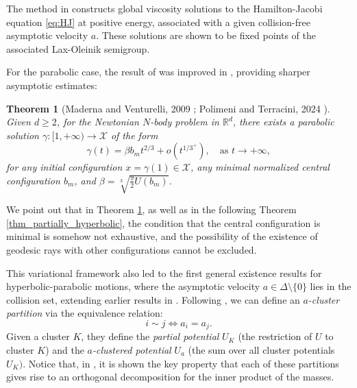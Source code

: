 \documentclass[a4paper,10pt]{amsart}
\theoremstyle{plain}
\newtheorem{thm}{Theorem}
\theoremstyle{definition}
\numberwithin{equation}{section}
\numberwithin{thm}{section}
\begin{document}
The method in \cite{MadernaVenturelli_HyperbolicMotions} constructs global viscosity solutions to the Hamilton-Jacobi equation \eqref{eq:HJ} at positive energy, associated with a given collision-free asymptotic velocity $a$. These solutions are shown to be fixed points of the associated Lax-Oleinik semigroup.

For the parabolic case, the result of \cite{MadernaVenturelli_GloballyMinimizingParabolic} was improved in \cite{PolimeniTerracini}, providing sharper asymptotic estimates:

\begin{thm}[Maderna and Venturelli, 2009 \cite{MadernaVenturelli_GloballyMinimizingParabolic}; Polimeni and Terracini, 2024 \cite{PolimeniTerracini}]\label{thm_parabolic}
    Given $d \geq 2$, for the Newtonian $N$-body problem in $\mathbb{R}^d$, there exists a parabolic solution $\gamma : [1,+\infty) \to \mathcal{X}$ of the form
    \begin{equation}\label{eq:parabolic}
        \gamma(t) = \beta b_m t^{2/3} + o(t^{1/3^+}), \quad \text{as } t \to +\infty,
    \end{equation}
    for any initial configuration $x = \gamma(1) \in \mathcal{X}$, any minimal normalized central configuration $b_m$, and $\beta = \sqrt[3]{\frac{9}{2}U(b_m)}$.
\end{thm}

We point out that in Theorem \ref{thm_parabolic}, as well as in the following Theorem \ref{thm_partially_hyperbolic}, the condition that the central configuration is minimal is somehow not exhaustive, and the possibility of the existence of geodesic rays with other configurations cannot be excluded.

This variational framework also led to the first general existence results for hyperbolic-parabolic motions, where the asymptotic velocity $a \in \Delta \setminus \{0\}$ lies in the collision set, extending earlier results in \cite{Burgos_PartiallyHyperbolic}. Following \cite{BurgosMaderna_GeodesicRays, PolimeniTerracini}, we can define an \emph{$a$-cluster partition} via the equivalence relation:
\begin{equation}\label{eq:equivalence_relation}
    i \sim j \Longleftrightarrow a_i = a_j.
\end{equation}
Given a cluster $K$, they define the \emph{partial potential} $U_K$ (the restriction of $U$ to cluster $K$) and the \emph{$a$-clustered potential} $U_a$ (the sum over all cluster potentials $U_K)$. Notice that, in \cite{BurgosMaderna_GeodesicRays}, it is shown the key property that each of these partitions gives rise to an orthogonal decomposition for the inner product of the masses.
\end{document}
